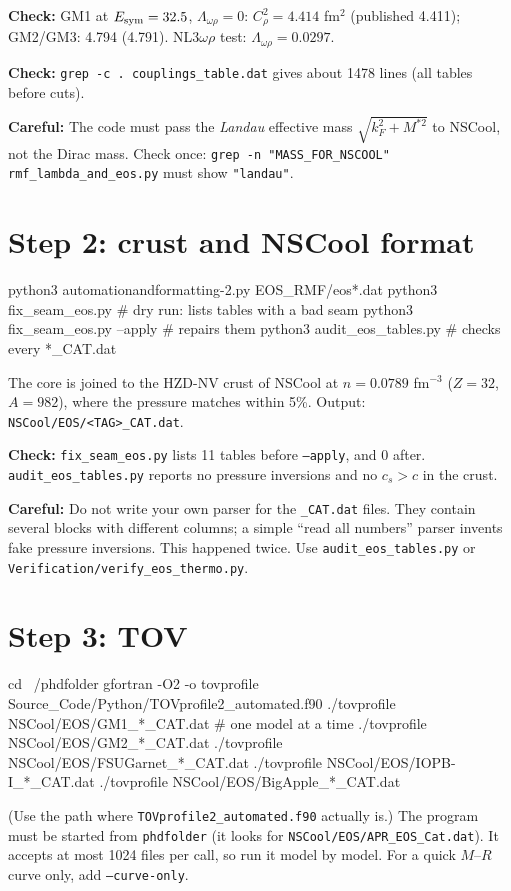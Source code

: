 \documentclass[11pt,a4paper]{article}
\newcommand{\Esym}{E_{\rm sym}}
\newcommand{\f}[1]{\texttt{#1}}
\newcommand{\ok}[1]{\par\noindent\textcolor{okc}{\textbf{Check:}} #1\par}
\newcommand{\warn}[1]{\par\noindent\textcolor{warnc}{\textbf{Careful:}} #1\par}
\begin{document}
\ok{GM1 at $\Esym=32.5$, $\Lambda_{\omega\rho}=0$: $C_\rho^2=4.414$ fm$^2$ (published 4.411); GM2/GM3: 4.794 (4.791). NL3$\omega\rho$ test: $\Lambda_{\omega\rho}=0.0297$.}
\ok{\f{grep -c . couplings\_table.dat} gives about 1478 lines (all tables before cuts).}
\warn{The code must pass the \emph{Landau} effective mass $\sqrt{k_F^2+M^{*2}}$ to NSCool, not the Dirac mass. Check once: \f{grep -n "MASS\_FOR\_NSCOOL" rmf\_lambda\_and\_eos.py} must show \f{"landau"}.}

\section{Step 2: crust and NSCool format}
\begin{cmd}
python3 automationandformatting-2.py EOS_RMF/eos*.dat
python3 fix_seam_eos.py            # dry run: lists tables with a bad seam
python3 fix_seam_eos.py --apply    # repairs them
python3 audit_eos_tables.py        # checks every *_CAT.dat
\end{cmd}
The core is joined to the HZD-NV crust of NSCool at $n=0.0789$ fm$^{-3}$ ($Z=32$, $A=982$), where the pressure matches within 5\%. Output: \f{NSCool/EOS/<TAG>\_CAT.dat}.

\ok{\f{fix\_seam\_eos.py} lists 11 tables before \f{--apply}, and 0 after. \f{audit\_eos\_tables.py} reports no pressure inversions and no $c_s>c$ in the crust.}
\warn{Do not write your own parser for the \f{\_CAT.dat} files. They contain several blocks with different columns; a simple ``read all numbers'' parser invents fake pressure inversions. This happened twice. Use \f{audit\_eos\_tables.py} or \f{Verification/verify\_eos\_thermo.py}.}

\section{Step 3: TOV}
\begin{cmd}
cd ~/phdfolder
gfortran -O2 -o tovprofile Source_Code/Python/TOVprofile2_automated.f90
./tovprofile NSCool/EOS/GM1_*_CAT.dat          # one model at a time
./tovprofile NSCool/EOS/GM2_*_CAT.dat
./tovprofile NSCool/EOS/FSUGarnet_*_CAT.dat
./tovprofile NSCool/EOS/IOPB-I_*_CAT.dat
./tovprofile NSCool/EOS/BigApple_*_CAT.dat
\end{cmd}
(Use the path where \f{TOVprofile2\_automated.f90} actually is.) The program must be started from \f{phdfolder} (it looks for \f{NSCool/EOS/APR\_EOS\_Cat.dat}). It accepts at most 1024 files per call, so run it model by model. For a quick $M$--$R$ curve only, add \f{--curve-only}.
\end{document}

